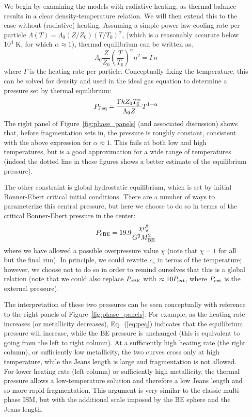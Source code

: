 \documentclass[useAMS,usenatbib]{mn2e}
\begin{document}
We begin by examining the models with radiative heating, as thermal balance results in a clear density-temperature relation.  We will then extend this to the case without (radiative) heating.  Assuming a simple power law cooling rate per particle $\Lambda(T) = \Lambda_0 (Z/Z_0) (T/T_0)^{\alpha}$, (which is a reasonably accurate below $10^4$ K, for which $\alpha \approx 1$), thermal equilibrium can be written as,
\begin{equation}
\Lambda_0 \frac{Z}{Z_0} \left( \frac{T}{T_0} \right)^{\alpha} n^2 = \Gamma n
\label{eq:thermal_eq}
\end{equation}
where $\Gamma$ is the heating rate per particle.  Conceptually fixing the temperature, this can be solved for density and used in the ideal gas equation to determine a pressure set by thermal equilibrium:
\begin{equation}
P_{\Gamma \rm eq} = \frac{\Gamma k Z_0 T_0^{\alpha}}{\Lambda_0 Z} T^{1-\alpha}
\label{eq:peq}
\end{equation}
The right panel of Figure~\ref{fig:phase_panels} (and associated discussion) shows that, before fragmentation sets in, the pressure is roughly constant, consistent with the above expression for $\alpha \approx 1$.  This fails at both low and high temperatures, but is a good approximation for a wide range of temperatures (indeed the dotted line in these figures shows a better estimate of the equilibrium pressure).

The other constraint is global hydrostatic equilibrium, which is set by initial Bonner-Ebert critical initial conditions.  There are a number of ways to parameterize this central pressure, but here we choose to do so in terms of the critical Bonner-Ebert pressure in the center:
\begin{equation}
P_{\rm cBE} = 19.9 \frac{\chi c_s^8}{G^3 M_{\rm BE}^2}
\end{equation}
where we have allowed a possible overpressure value $\chi$ (note that $\chi = 1$ for all but the final run).  In principle, we could rewrite $c_s$ in terms of the temperature; however, we choose not to do so in order to remind ourselves that this is a global relation (note that we could also replace $P_{\rm cBE}$ with $\approx 10 P_{\rm ext}$, where $P_{\rm ext}$ is the external pressure).

The interpretation of these two pressures can be seen conceptually with reference to the right panels of Figure~\ref{fig:phase_panels}.  For example, as the heating rate increases (or metallicity decreases), Eq.~(\ref{eq:peq}) indicates that the equilibrium pressure will increase, while the BE pressure is unchanged (this is equivalent to going from the left to right column).  At a sufficiently high heating rate (the right column), or sufficiently low metallicity, the two curves cross only at high temperature, while the Jeans length is large and fragmentation is not allowed.  For lower heating rate (left column) or sufficiently high metallicity, the thermal pressure allows a low-temperature solution and therefore a low Jeans length and so more rapid fragmentation.  This argument is very similar to the classic multi-phase ISM, but with the additional scale imposed by the BE sphere and the Jeans length.
\end{document}
